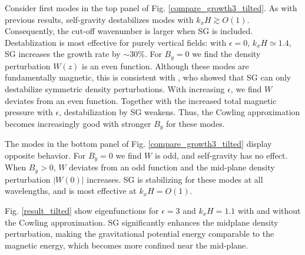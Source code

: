 Consider first modes in the top panel of 
Fig. \ref{compare_growth3_tilted}. As with previous results,  
self-gravity destabilizes modes with  $k_xH\gtrsim O(1)$. Consequently, the
cut-off wavenumber is larger when SG is included. %
Destablization is most effective for purely vertical fields: with
$\epsilon=0,\, k_xH\simeq 1.4$, SG increases the growth rate by $\sim
30\%$. For $B_y=0$ we find the density perturbation $W(z)$ is an even
function. Although these modes are fundamentally magnetic, this is consistent with
\cite{goldreich65a}, who showed that SG can only destabilize 
symmetric density perturbations.  
With increasing $\epsilon$, we find $W$ deviates from an even
function. %
Together with the increased total magnetic pressure with 
$\epsilon$, destabilization by SG weakens. 
Thus, the Cowling approximation becomes increasingly good with stronger
$B_y$ for these modes. 


The modes in the bottom panel of Fig. \ref{compare_growth3_tilted} 
display opposite behavior. For $B_y=0$ we find $W$ is odd, and
self-gravity has no effect. When $B_y>0$, $W$ deviates from an
odd function and the mid-plane density perturbation $|W(0)|$
increases. SG is stabilizing for these modes at all wavelengths, and
is most effective at $k_xH =  O(1)$.  

Fig. \ref{result_tilted} show eigenfunctions for $\epsilon=3$ and
$k_xH=1.1$ with and without the Cowling approximation. 
SG significantly enhances the midplane density perturbation, making the
gravitational potential energy comparable to the magnetic energy, 
which becomes more confined near the mid-plane. 

